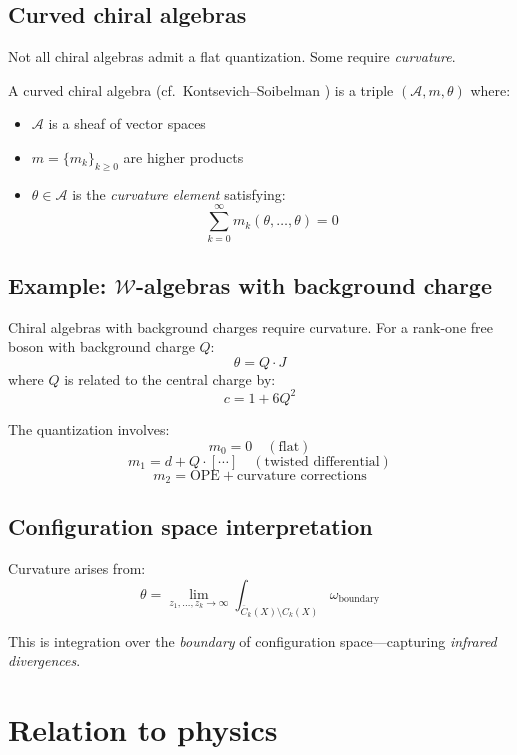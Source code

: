 \subsection{Curved chiral algebras}

Not all chiral algebras admit a flat quantization. Some require \emph{curvature}.

\begin{definition}
A curved chiral algebra (cf.\ Kontsevich--Soibelman \cite{KontsevichSoibelman}) is a triple $(\mathcal{A}, m, \theta)$ where:
\begin{itemize}
\item $\mathcal{A}$ is a sheaf of vector spaces
\item $m = \{m_k\}_{k \geq 0}$ are higher products
\item $\theta \in \mathcal{A}$ is the \emph{curvature element} satisfying:
\[\sum_{k=0}^\infty m_k(\theta, \ldots, \theta) = 0\]
\end{itemize}
\end{definition}

\subsection{Example: $\mathcal{W}$-algebras with background charge}

Chiral algebras with background charges require curvature. For a rank-one free boson with background charge $Q$:
\[\theta = Q \cdot J\]
where $Q$ is related to the central charge by:
\[c = 1 + 6Q^2\]

The quantization involves:
\[m_0 = 0 \quad (\text{flat})\]
\[m_1 = d + Q \cdot [\cdots] \quad (\text{twisted differential})\]
\[m_2 = \text{OPE} + \text{curvature corrections}\]

\subsection{Configuration space interpretation}

Curvature arises from:
\[\theta = \lim_{z_1, \ldots, z_k \to \infty} \int_{\overline{C}_k(X) \setminus C_k(X)} \omega_{\text{boundary}}\]

This is integration over the \emph{boundary} of configuration space—capturing \emph{infrared divergences}.

\section{Relation to physics}

